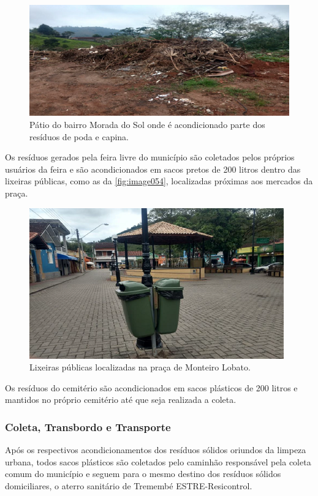 \begin{figure}
	\centering
	\includegraphics[width=0.75\linewidth]{produtos/prodtres/image053}
	\caption{Pátio do bairro Morada do Sol onde é acondicionado parte dos resíduos de poda e capina.}
	\label{fig:image053}
\end{figure}

Os resíduos gerados pela feira livre do município são coletados pelos próprios usuários da feira e são acondicionados em sacos pretos de 200 litros dentro das lixeiras públicas, como as da \autoref{fig:image054}, localizadas próximas aos mercados da praça.

\begin{figure}
	\centering
	\includegraphics[width=0.7\linewidth]{produtos/prodtres/image054}
	\caption{Lixeiras públicas localizadas na praça de Monteiro Lobato.}
	\label{fig:image054}
\end{figure}


Os resíduos do cemitério são acondicionados em sacos plásticos de 200 litros e mantidos no próprio cemitério até que seja realizada a coleta.

\subsubsection{Coleta, Transbordo e Transporte}

Após os respectivos acondicionamentos dos resíduos sólidos oriundos da limpeza urbana, todos sacos plásticos são coletados pelo caminhão responsável pela coleta comum do município e seguem para o mesmo destino dos resíduos sólidos domiciliares, o aterro sanitário de Tremembé ESTRE-Resicontrol.

